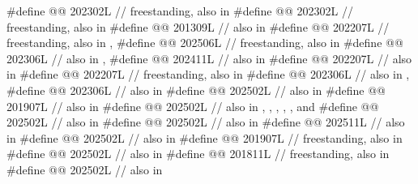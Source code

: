 \begin{codeblock}
#define @@                  202302L // freestanding, also in 
#define @@          202302L // freestanding, also in 
#define @@                      201309L // also in 
#define @@                          202207L
  // freestanding, also in , 
#define @@                  202506L // freestanding, also in 
#define @@              202306L // also in , 
#define @@                  202411L // also in 
#define @@                  202207L // also in 
#define @@                202207L // freestanding, also in 
#define @@                   202306L // also in , 
#define @@                 202306L // also in 
#define @@                   202502L // also in 
#define @@           201907L // also in 
#define @@              202502L
  // also in , , , , , and 
#define @@                202502L // also in 
#define @@                202502L // also in 
#define @@                  202511L // also in 
#define @@            202502L // also in 
#define @@              201907L // freestanding, also in 
#define @@          202502L // also in 
#define @@                201811L // freestanding, also in 
#define @@                    202502L // also in 

\end{codeblock}
